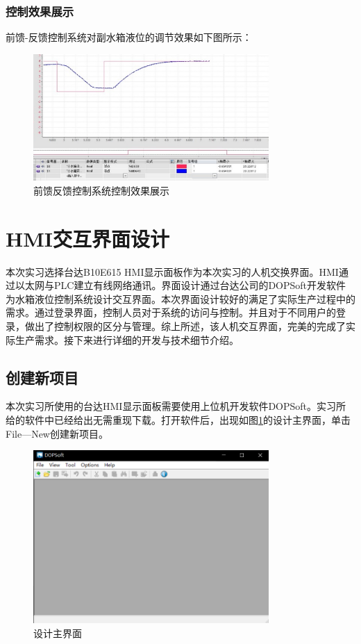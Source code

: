 \documentclass[UTF8]{article}
\begin{document}
\subsubsection{控制效果展示}
前馈-反馈控制系统对副水箱液位的调节效果如下图所示：
\begin{figure}[H]
    \centering %
    \includegraphics[width=0.8\textwidth]{figure/前馈反馈-控制效果.png} 
    \caption{前馈反馈控制系统控制效果展示} %
\end{figure}

%
\section{HMI交互界面设计}
本次实习选择台达B10E615 HMI显示面板作为本次实习的人机交换界面。HMI通过以太网与PLC建立有线网络通讯。界面设计通过台达公司的DOPSoft开发软件为水箱液位控制系统设计交互界面。本次界面设计较好的满足了实际生产过程中的需求。通过登录界面，控制人员对于系统的访问与控制。并且对于不同用户的登录，做出了控制权限的区分与管理。综上所述，该人机交互界面，完美的完成了实际生产需求。接下来进行详细的开发与技术细节介绍。

\subsection{创建新项目}
本次实习所使用的台达HMI显示面板需要使用上位机开发软件DOPSoft。实习所给的软件中已经给出无需重现下载。打开软件后，出现如图\ref{fig:img1}的设计主界面，单击File—New创建新项目。
\begin{figure}[H]
    \centering %
    \includegraphics[width=0.8\textwidth]{figure/设计主界面.png} 
    \caption{设计主界面} %
    \label{fig:img1} %
\end{figure}
\end{document}
